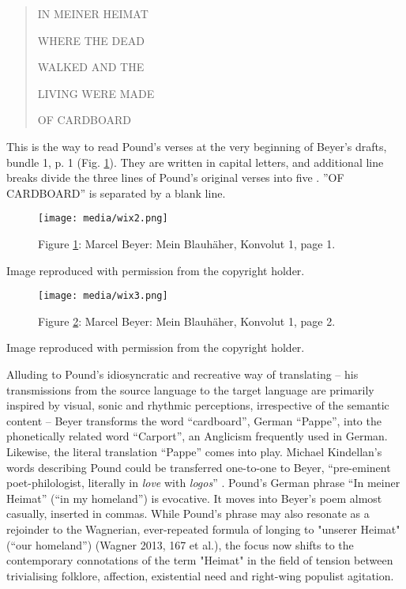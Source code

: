 \documentclass{article}
\begin{document}
\begin{quote}
IN MEINER HEIMAT

WHERE THE DEAD

WALKED AND THE

LIVING WERE MADE

\vspace{1em}

OF CARDBOARD
\end{quote}

This is the way to read Pound's verses at the very beginning of Beyer's
drafts, bundle 1, p. 1 (Fig. \ref{fig:wix2}). They are written in capital letters, and
additional line breaks divide the three lines of Pound's original verses into five
\citep[1172]{pound_cantos_2012}. ''OF CARDBOARD'' is separated by a blank
line.


\begin{figure}[ph]
    \centering
    \texttt{[image: media/wix2.png]}
    \caption{Figure \ref{fig:wix2}: Marcel Beyer: Mein Blauhäher, Konvolut 1, page 1.}
    \label{fig:wix2}
\end{figure}

Image reproduced with permission from the copyright holder.

\begin{figure}[ph]
    \centering
    \texttt{[image: media/wix3.png]}
    \caption{Figure \ref{fig:wix3}: Marcel Beyer: Mein Blauhäher, Konvolut 1, page 2.}
    \label{fig:wix3}
\end{figure}

Image reproduced with permission from the copyright holder.

Alluding to Pound's idiosyncratic and recreative way of translating
\citep{hesse_tertium_2001} -- his transmissions from the source language to the target
language are primarily inspired by visual, sonic and rhythmic
perceptions, irrespective of the semantic content -- Beyer transforms
the word ``cardboard'', German ``Pappe'', into the phonetically related
word ``Carport'', an Anglicism frequently used in German. Likewise, the
literal translation ``Pappe'' comes into play. Michael Kindellan's words
describing Pound could be transferred one-to-one to Beyer, ``pre-eminent
poet-philologist, literally in \emph{love} with \emph{logos}''
\citep[1]{Kindellan_late_2017}. Pound's German phrase ``In meiner Heimat'' (``in my homeland'') is
evocative. It moves into Beyer's poem almost casually, inserted in
commas. While Pound's phrase may also resonate as a rejoinder to the
Wagnerian, ever-repeated formula of longing to "unserer Heimat" (``our
homeland'') (Wagner 2013, 167 et al.), the focus now shifts to the
contemporary connotations of the term "Heimat" in the field of tension
between trivialising folklore, affection, existential need and right-wing
populist agitation.
\end{document}
